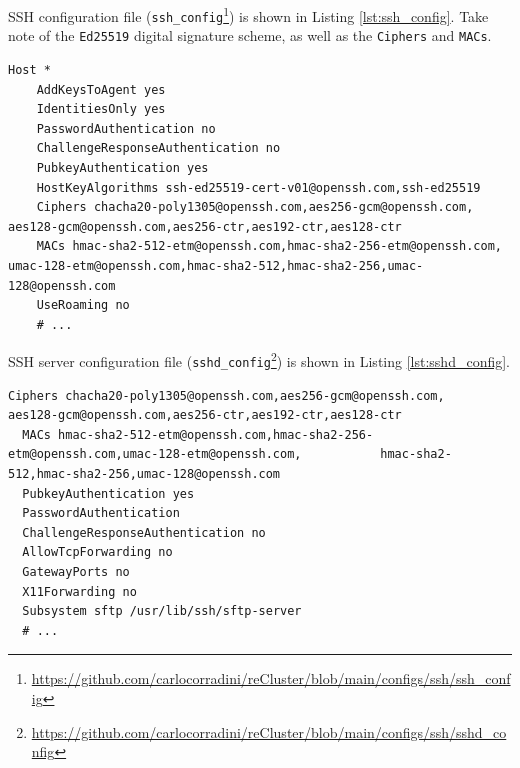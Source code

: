 SSH configuration file (\texttt{ssh\_config}\footnote{\url{https://github.com/carlocorradini/reCluster/blob/main/configs/ssh/ssh_config}})
is shown in Listing \ref{lst:ssh_config}. Take note of the \texttt{Ed25519}
digital signature scheme, as well as the \texttt{Ciphers} and \texttt{MACs}.

\begin{lstlisting}[language=shell, alsoletter={*.-@}, morekeywords={[4]{Host, AddKeysToAgent, IdentitiesOnly, PasswordAuthentication, ChallengeResponseAuthentication, PubkeyAuthentication, HostKeyAlgorithms, Ciphers, MACs, UseRoaming}}, keywordstyle={[5]\color{shellGreen}}, morekeywords={[5]{*, yes, no, ssh-ed25519-cert-v01@openssh.com, ssh-ed25519, chacha20-poly1305@openssh.com, aes256-gcm@openssh.com, aes128-gcm@openssh.com, aes256-ctr, aes192-ctr, aes128-ctr, hmac-sha2-512-etm@openssh.com, hmac-sha2-256-etm@openssh.com, umac-128-etm@openssh.com, hmac-sha2-512, hmac-sha2-256, umac-128@openssh.com}}, xleftmargin=\parindent, label={lst:ssh_config}, caption=SSH configuration file]
  Host *
    AddKeysToAgent yes
    IdentitiesOnly yes
    PasswordAuthentication no
    ChallengeResponseAuthentication no
    PubkeyAuthentication yes
    HostKeyAlgorithms ssh-ed25519-cert-v01@openssh.com,ssh-ed25519
    Ciphers chacha20-poly1305@openssh.com,aes256-gcm@openssh.com,                                           aes128-gcm@openssh.com,aes256-ctr,aes192-ctr,aes128-ctr
    MACs hmac-sha2-512-etm@openssh.com,hmac-sha2-256-etm@openssh.com,                                    umac-128-etm@openssh.com,hmac-sha2-512,hmac-sha2-256,umac-128@openssh.com
    UseRoaming no
    # ...
\end{lstlisting}

SSH server configuration file (\texttt{sshd\_config}\footnote{\url{https://github.com/carlocorradini/reCluster/blob/main/configs/ssh/sshd_config}})
is shown in Listing \ref{lst:sshd_config}.

\begin{lstlisting}[language=shell, xleftmargin=\parindent, alsoletter={*.-@/}, morekeywords={[4]{Ciphers, MACs, PubkeyAuthentication, PasswordAuthentication, ChallengeResponseAuthentication, AllowTcpForwarding, GatewayPorts, X11Forwarding, Subsystem}}, keywordstyle={[5]\color{shellGreen}}, morekeywords={[5]{no, yes, sftp, /usr/lib/ssh/sftp-server, chacha20-poly1305@openssh.com, aes256-gcm@openssh.com, aes128-gcm@openssh.com, aes256-ctr, aes192-ctr, aes128-ctr, hmac-sha2-512-etm@openssh.com, hmac-sha2-256-etm@openssh.com, umac-128-etm@openssh.com, hmac-sha2-512, hmac-sha2-256, umac-128@openssh.com}}, label={lst:sshd_config}, caption=SSH server configuration file]
  Ciphers chacha20-poly1305@openssh.com,aes256-gcm@openssh.com,                                           aes128-gcm@openssh.com,aes256-ctr,aes192-ctr,aes128-ctr
  MACs hmac-sha2-512-etm@openssh.com,hmac-sha2-256-etm@openssh.com,umac-128-etm@openssh.com,           hmac-sha2-512,hmac-sha2-256,umac-128@openssh.com
  PubkeyAuthentication yes
  PasswordAuthentication
  ChallengeResponseAuthentication no
  AllowTcpForwarding no
  GatewayPorts no
  X11Forwarding no
  Subsystem sftp /usr/lib/ssh/sftp-server
  # ...
\end{lstlisting}